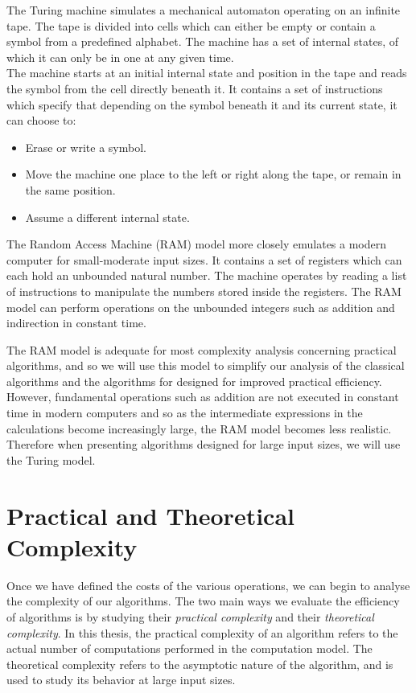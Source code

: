The Turing machine simulates a mechanical automaton operating on an infinite tape. The tape is divided into cells which can either be empty or contain a symbol from a predefined alphabet. The machine has a set of internal states, of which it can only be in one at any given time.\\
The machine starts at an initial internal state and position in the tape and reads the symbol from the cell directly beneath it. It contains a set of instructions which specify that depending on the symbol beneath it and its current state, it can choose to:
\begin{itemize}
    \item Erase or write a symbol.
    \item Move the machine one place to the left or right along the tape, or remain in the same position.
    \item Assume a different internal state.
\end{itemize}

The Random Access Machine (RAM) model more closely emulates a modern computer for small-moderate input sizes. It contains a set of registers which can each hold an unbounded natural number. The machine operates by reading a list of instructions to manipulate the numbers stored inside the registers. The RAM model can perform operations on the unbounded integers such as addition and indirection in constant time.

The RAM model is adequate for most complexity analysis concerning practical algorithms, and so we will use this model to simplify our analysis of the classical algorithms and the algorithms for designed for improved practical efficiency. However, fundamental operations such as addition are not executed in constant time in modern computers and so as the intermediate expressions in the calculations become increasingly large, the RAM model becomes less realistic. Therefore when presenting algorithms designed for large input sizes, we will use the Turing model.

\section{Practical and Theoretical Complexity}%
\label{sec:Practical and Theoretical Complexity}

Once we have defined the costs of the various operations, we can begin to analyse the complexity of our algorithms. The two main ways we evaluate the efficiency of algorithms is by studying their \emph{practical complexity} and their \emph{theoretical complexity}. In this thesis, the practical complexity of an algorithm refers to the actual number of computations performed in the computation model. The theoretical complexity refers to the asymptotic nature of the algorithm, and is used to study its behavior at large input sizes.

